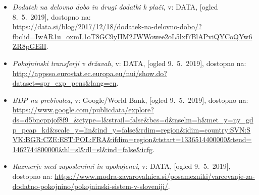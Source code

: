 \documentclass[10pt]{beamer}
\begin{document}
\begin{frame}
\begin{itemize}
\item
\label{Dodatek na delovno dobo in drugi dodatki k plači}
\emph{Dodatek na delovno dobo in drugi dodatki k plači}, v: DATA, [ogled 8.~5.~2019], dostopno na:\\ \url{https://data.si/blog/2017/12/18/dodatek-na-delovno-dobo/?fbclid=IwAR1u_oxmL1oT8GC9yIIM2JWWowee2oL5lxf7BlAPviQYCoQYw6ZR8pGEilI}.



\item
\label{Pokojninski transferji v državah}
\emph{Pokojninski transferji v državah}, v: DATA, [ogled 9.~5.~2019], dostopno na: \url{http://appsso.eurostat.ec.europa.eu/nui/show.do?dataset=spr_exp_pens&lang=en}.

\item
\label{BDP na prebivalca}
\emph{BDP na prebivalca}, v: Google/World Bank, [ogled 9.~5.~2019], dostopno na: \url{https://www.google.com/publicdata/explore?ds=d5bncppjof8f9_&ctype=l&strail=false&bcs=d&nselm=h&met_y=ny_gdp_pcap_kd&scale_y=lin&ind_y=false&rdim=region&idim=country:SVN:SVK:BGR:CZE:EST:POL:FRA&ifdim=region&tstart=1336514400000&tend=1462744800000&hl=sl&dl=sl&ind=false&icfg}.

\item
\label{Razmerje med zaposlenimi in upokojenci}
\emph{Razmerje med zaposlenimi in upokojenci}, v: DATA, [ogled 9.~5.~2019], dostopno na: \url{https://www.modra-zavarovalnica.si/posamezniki/varcevanje-za-dodatno-pokojnino/pokojninski-sistem-v-sloveniji/}.
\end{itemize}


\end{frame}
\end{document}
